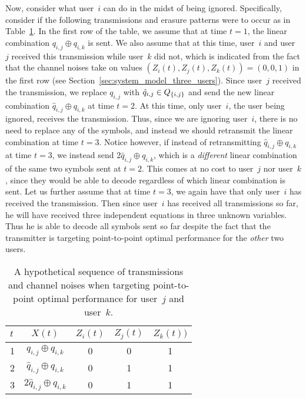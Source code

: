 Now, consider what user~$i$ can do in the midst of being ignored.  Specifically, consider if the following transmissions and erasure patterns were to occur as in Table~\ref{tab:hypothetical_chaining}.  In the first row of the table, we assume that at time $t = 1$, the linear combination $q_{i, j} \oplus q_{i, k}$ is sent.  We also assume that at this time, user~$i$ and user~$j$ received this transmission while user~$k$ did not, which is indicated from the fact that the channel noises take on values $(Z_{i}(t), Z_{j}(t), Z_{k}(t)) = (0, 0, 1)$ in the first row (see Section~\ref{sec:system_model_three_users}).  Since user~$j$ received the transmission, we replace $q_{i, j}$ with $\hat{q}_{i, j} \in Q_{\{i, j\}}$ and send the new linear combination $\hat{q}_{i, j} \oplus q_{i, k}$ at time $t = 2$.  At this time, only user~$i$, the user being ignored, receives the transmission.  Thus, since we are ignoring user~$i$, there is no need to replace any of the symbols, and instead we should retransmit the linear combination at time $t = 3$.  Notice however, if instead of retransmitting $\hat{q}_{i, j} \oplus q_{i, k}$ at time $t = 3$, we instead send $2\hat{q}_{i, j} \oplus q_{i, k}$, which is a \emph{different} linear combination of the same two symbols sent at $t = 2$.  This comes at no cost to user~$j$ nor user~$k$, since they would be able to decode regardless of which linear combination is sent. Let us further assume that at time $t = 3$, we again have that only user~$i$ has received the transmission.  Then since user~$i$ has received all transmissions so far, he will have received three independent equations in three unknown variables.  Thus he is able to decode all symbols sent so far despite the fact that the transmitter is targeting point-to-point optimal performance for the \emph{other} two users.  

\begin{table}
	\begin{center}
		\begin{tabular}{l c c c c}
			$t$              & $X(t)$ & $Z_{i}(t)$& $Z_{j}(t)$ & $Z_{k}(t))$  \\
			\hline
			1 & $q_{i, j} \oplus q_{i, k}$ & 0 & 0 & 1 \\
			2 & $\hat{q}_{i, j} \oplus q_{i, k}$ & 0 & 1 & 1 \\
			3 & $2\hat{q}_{i, j} \oplus q_{i, k}$ & 0 & 1 & 1 \\
		\end{tabular}
	\end{center}
	\caption{A hypothetical sequence of transmissions and channel noises when targeting point-to-point optimal performance for user~$j$ and user~$k$.}	
	\label{tab:hypothetical_chaining}
\end{table}

